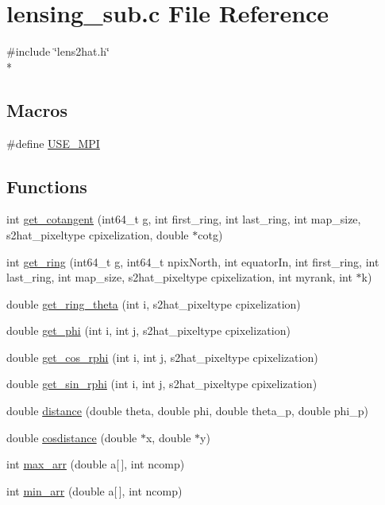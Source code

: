 \section{lensing\-\_\-sub.\-c File Reference}
\label{common_2lensing__sub_8c}
{\ttfamily \#include \char`\"{}lens2hat.\-h\char`\"{}}\\*
\subsection*{Macros}
\begin{DoxyCompactItemize}
\item 
\#define \hyperlink{common_2lensing__sub_8c_a3869d282031f6ea6b50fdb980b758420}{U\-S\-E\-\_\-\-M\-P\-I}
\end{DoxyCompactItemize}
\subsection*{Functions}
\begin{DoxyCompactItemize}
\item 
int \hyperlink{common_2lensing__sub_8c_adfd4526ab7b84ab4063eafa3aff125f5}{get\-\_\-cotangent} (int64\-\_\-t g, int first\-\_\-ring, int last\-\_\-ring, int map\-\_\-size, s2hat\-\_\-pixeltype cpixelization, double $\ast$cotg)
\item 
int \hyperlink{common_2lensing__sub_8c_a515ce6e32c83cc252ce2d98da4b8f6d0}{get\-\_\-ring} (int64\-\_\-t g, int64\-\_\-t npix\-North, int equator\-In, int first\-\_\-ring, int last\-\_\-ring, int map\-\_\-size, s2hat\-\_\-pixeltype cpixelization, int myrank, int $\ast$k)
\item 
double \hyperlink{common_2lensing__sub_8c_a01cfb565f05ca0574ffe427957766e22}{get\-\_\-ring\-\_\-theta} (int i, s2hat\-\_\-pixeltype cpixelization)
\item 
double \hyperlink{common_2lensing__sub_8c_a8b0d92bd46d564b7cb02a352506cd8d1}{get\-\_\-phi} (int i, int j, s2hat\-\_\-pixeltype cpixelization)
\item 
double \hyperlink{common_2lensing__sub_8c_ade4546fa40d7a7fb7f0e9e8e7ac745df}{get\-\_\-cos\-\_\-rphi} (int i, int j, s2hat\-\_\-pixeltype cpixelization)
\item 
double \hyperlink{common_2lensing__sub_8c_aacc42f0ba3fce9b9951cd6dba4d60ebf}{get\-\_\-sin\-\_\-rphi} (int i, int j, s2hat\-\_\-pixeltype cpixelization)
\item 
double \hyperlink{common_2lensing__sub_8c_a8dbb3ac3e6c8aa872d542c9789239708}{distance} (double theta, double phi, double theta\-\_\-p, double phi\-\_\-p)
\item 
double \hyperlink{common_2lensing__sub_8c_a356fc5cd79e083685c111f791709e85b}{cosdistance} (double $\ast$x, double $\ast$y)
\item 
int \hyperlink{common_2lensing__sub_8c_a19e2918b377bd820f3a20dee06b88de2}{max\-\_\-arr} (double a\mbox{[}$\,$\mbox{]}, int ncomp)
\item 
int \hyperlink{common_2lensing__sub_8c_a3f0449ae9cbd5c0005db6d26da882085}{min\-\_\-arr} (double a\mbox{[}$\,$\mbox{]}, int ncomp)
\end{DoxyCompactItemize}


